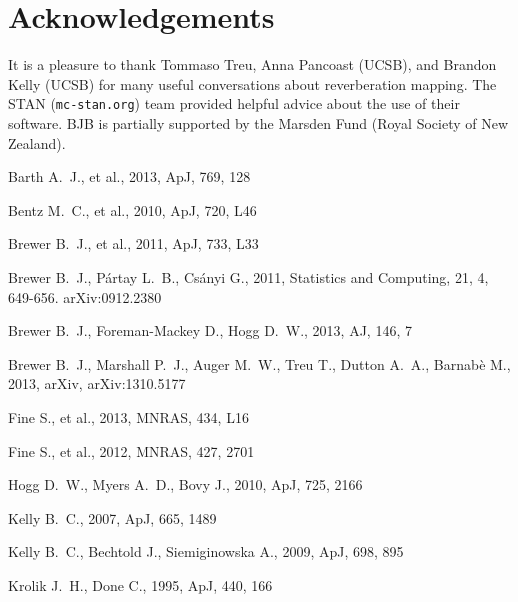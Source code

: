 \documentclass[useAMS,usenatbib]{mn2e}
\begin{document}
\section*{Acknowledgements}
It is a pleasure to thank Tommaso Treu, Anna Pancoast (UCSB), and
Brandon Kelly (UCSB) for many
useful conversations about reverberation mapping. The STAN ({\tt mc-stan.org})
team provided helpful advice about the use of their software. BJB is partially
supported by the Marsden Fund (Royal Society of New Zealand).

\begin{thebibliography}{99}
Barth A.~J., et al., 2013, ApJ, 769, 128 

Bentz M.~C., et al., 2010, ApJ, 720, L46 

Brewer B.~J., et al., 2011, ApJ, 733, L33 

 Brewer B.~J., P{\'a}rtay L.~B.,
Cs{\'a}nyi G., 2011, Statistics and Computing, 21, 4, 649-656. arXiv:0912.2380

 Brewer B.~J., Foreman-Mackey D., Hogg D.~W., 2013, AJ, 146, 7 

Brewer B.~J., Marshall P.~J., Auger M.~W., Treu T., Dutton A.~A., 
Barnab{\`e} M., 2013, arXiv, arXiv:1310.5177 

Fine S., et al., 2013, MNRAS, 434, L16 

Fine S., et al., 2012, MNRAS, 427, 2701 

 Hogg D.~W., Myers A.~D., Bovy J., 2010, ApJ, 725, 2166 

 Kelly 
B.~C., 2007, ApJ, 665, 1489 

 Kelly B.~C., Bechtold J.,
Siemiginowska A., 2009, ApJ, 698, 895 

 Krolik J.~H., Done C., 1995, ApJ, 440, 166 


\end{thebibliography}
\end{document}
